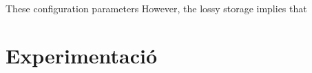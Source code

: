



 These configuration parameters
However, the lossy storage implies that












\section{Experimentació}





